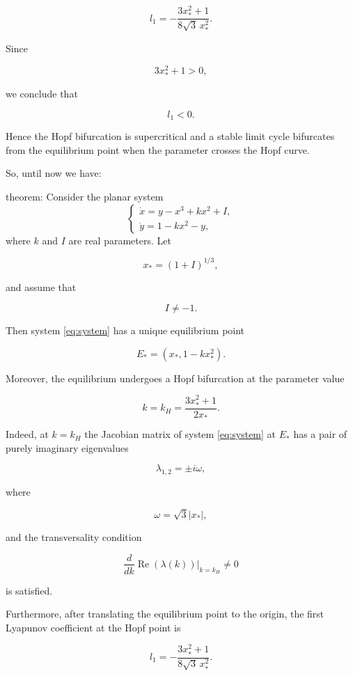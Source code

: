 \documentclass[11pt,reqno]{amsart}
\theoremstyle{plain}
\theoremstyle{definition}
\theoremstyle{remark}
\begin{document}
\begin{equation}
\label{eq:l1}
l_1=
-\frac{3x_*^2+1}
{8\sqrt{3}\,x_*^2}.
\end{equation}

Since

\[
3x_*^2+1>0,
\]

we conclude that

\[
l_1<0 .
\]

Hence the Hopf bifurcation is supercritical and a stable limit cycle
bifurcates from the equilibrium point when the parameter crosses the
Hopf curve.

So, until now we have: 

{theorem:}
\label{thm:hopf_limit_cycle}
Consider the planar system
\begin{equation}
\label{eq:system}
\begin{cases}
\dot{x}=y-x^3+kx^2+I,\\[1mm]
\dot{y}=1-kx^2-y,
\end{cases}
\end{equation}
where $k$ and $I$ are real parameters. Let

\[
x_*=(1+I)^{1/3},
\]

and assume that

\[
I\neq -1.
\]

Then system \eqref{eq:system} has a unique equilibrium point

\[
E_*=
\left(
x_*,
1-kx_*^2
\right).
\]

Moreover, the equilibrium undergoes a Hopf bifurcation at the
parameter value

\begin{equation}
\label{eq:hopf}
k=k_H=
\frac{3x_*^2+1}{2x_*}.
\end{equation}

Indeed, at $k=k_H$ the Jacobian matrix of system \eqref{eq:system}
at $E_*$ has a pair of purely imaginary eigenvalues

\[
\lambda_{1,2}=\pm i\omega ,
\]

where

\[
\omega=\sqrt{3}|x_*|,
\]

and the transversality condition

\[
\frac{d}{dk}\operatorname{Re}(\lambda(k))
\bigg|_{k=k_H}\neq0
\]

is satisfied.

Furthermore, after translating the equilibrium point to the origin,
the first Lyapunov coefficient at the Hopf point is

\begin{equation}
\label{eq:l1}
l_1=
-\frac{3x_*^2+1}
{8\sqrt{3}\,x_*^2}.
\end{equation}
\end{document}
